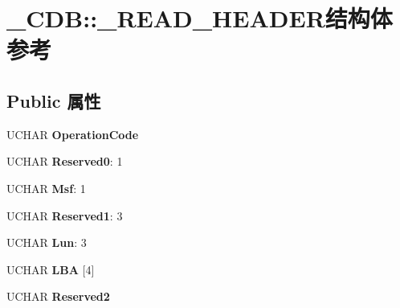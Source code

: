 \hypertarget{struct___c_d_b_1_1___r_e_a_d___h_e_a_d_e_r}{}\section{\+\_\+\+C\+DB\+:\+:\+\_\+\+R\+E\+A\+D\+\_\+\+H\+E\+A\+D\+E\+R结构体 参考}
\label{struct___c_d_b_1_1___r_e_a_d___h_e_a_d_e_r}
\subsection*{Public 属性}
\begin{DoxyCompactItemize}
\item 
\mbox{\label{struct___c_d_b_1_1___r_e_a_d___h_e_a_d_e_r_a88a6ff08dc792109dc81d9c95ab08234}} 
U\+C\+H\+AR {\bfseries Operation\+Code}
\item 
\mbox{\label{struct___c_d_b_1_1___r_e_a_d___h_e_a_d_e_r_af32a67761fefce4500cf03975ceb3556}} 
U\+C\+H\+AR {\bfseries Reserved0}\+: 1
\item 
\mbox{\label{struct___c_d_b_1_1___r_e_a_d___h_e_a_d_e_r_a097247bdd03f6368ca1f6d8fe478f0de}} 
U\+C\+H\+AR {\bfseries Msf}\+: 1
\item 
\mbox{\label{struct___c_d_b_1_1___r_e_a_d___h_e_a_d_e_r_aaabbed06e68669ed5a740837d71f58fd}} 
U\+C\+H\+AR {\bfseries Reserved1}\+: 3
\item 
\mbox{\label{struct___c_d_b_1_1___r_e_a_d___h_e_a_d_e_r_ad1ececb781cdc60fc153e674981adce5}} 
U\+C\+H\+AR {\bfseries Lun}\+: 3
\item 
\mbox{\label{struct___c_d_b_1_1___r_e_a_d___h_e_a_d_e_r_a2d11fe051de1feefe6e4afc9b3b551df}} 
U\+C\+H\+AR {\bfseries L\+BA} \mbox{[}4\mbox{]}
\item 
\mbox{\label{struct___c_d_b_1_1___r_e_a_d___h_e_a_d_e_r_aea1677b7ba481ba02e7056d73f9f06f1}} 
U\+C\+H\+AR {\bfseries Reserved2}

\end{DoxyCompactItemize}
